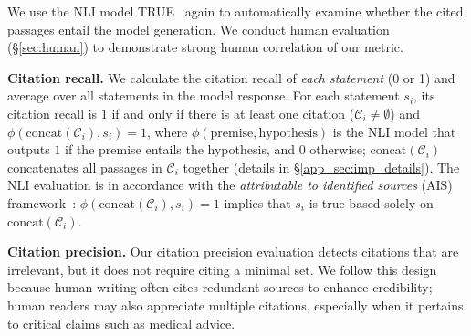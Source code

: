 \documentclass[11pt]{article}
\renewcommand{\paragraph}[1]{\vspace{0.2cm}\noindent\textbf{#1}}
\begin{document}
We use the NLI model TRUE~\citep{honovich-etal-2022-true-evaluating} again
to automatically examine whether the cited passages entail the model generation.
We conduct human evaluation (\S\ref{sec:human}) to demonstrate strong human correlation of our metric.





\paragraph{Citation recall.} 
We calculate the citation recall of \textit{each statement} (0 or 1) and average
over all {statements} in the model response. %
For each statement $s_i$, %
its citation recall is $1$ if and only if there is at least one citation ($\mathcal{C}_i\neq \emptyset$) and 
$\phi(\text{concat}(\mathcal{C}_i), s_i)=1$,
where 
$\phi(\text{premise},\text{hypothesis})$
is the NLI model that outputs $1$ if the premise  entails the hypothesis, and $0$ otherwise; 
$\text{concat}(\mathcal{C}_i)$ concatenates all passages in $\mathcal{C}_i$ together (details in \S\ref{app_sec:imp_details}).
The NLI evaluation is in accordance with the \textit{attributable to identified sources} (AIS) framework~\cite{rashkin2021measuring}: 
$\phi(\text{concat}(\mathcal{C}_i), s_i)=1$ implies that 
$s_i$ is true based solely on $\text{concat}(\mathcal{C}_i)$.



 



\paragraph{Citation precision.} 
Our citation precision evaluation detects citations that are irrelevant,
but it does not require citing a minimal set.
We follow this design  because human writing often cites  redundant sources to enhance  credibility;
human readers may also appreciate multiple citations, especially when it pertains to critical claims such as medical advice.
\end{document}
